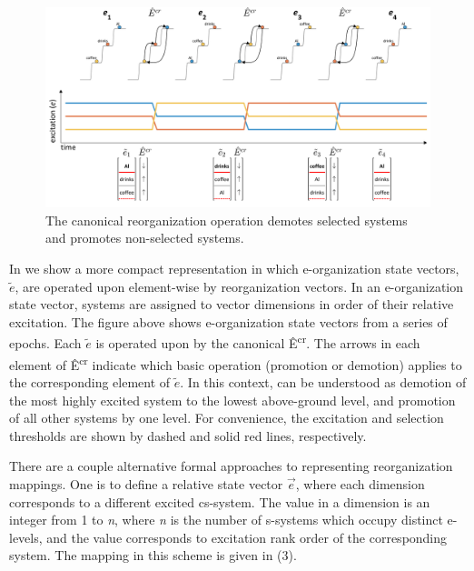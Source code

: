   
\begin{figure}
\includegraphics[width=\textwidth]{figures/Tilsen-img25.png}
\caption{The canonical reorganization operation demotes selected systems and promotes non-selected systems.}
\label{fig:2:18}
\end{figure}
 

  In {} we show a more compact representation in which e-organization state vectors,  $\widetilde{{e}}$, are operated upon element-wise by reorganization vectors. In an e-organization state vector, systems are assigned to vector dimensions in order of their relative excitation. The figure above shows e-organization state vectors from a series of epochs. Each  $\widetilde{{e}}$ is operated upon by the canonical  Ê\textsuperscript{cr}. The arrows in each element of Ê\textsuperscript{cr} indicate which basic operation (promotion or demotion) applies to the corresponding element of  $\widetilde{{e}}$. In this context,  can be understood as demotion of the most highly excited system to the lowest above-ground level, and promotion of all other systems by one level. For convenience, the excitation and selection thresholds are shown by dashed and solid red lines, respectively.

  There are a couple alternative formal approaches to representing reorganization mappings. One is to define a relative  state vector  $\overrightarrow{{e}}$, where each dimension corresponds to a different excited cs-system. The value in a dimension is an integer from 1 to \textit{n}, where \textit{n} is the number of s-systems which occupy distinct e-levels, and the value corresponds to excitation rank order of the corresponding system. The  mapping in this scheme is given in (3).


